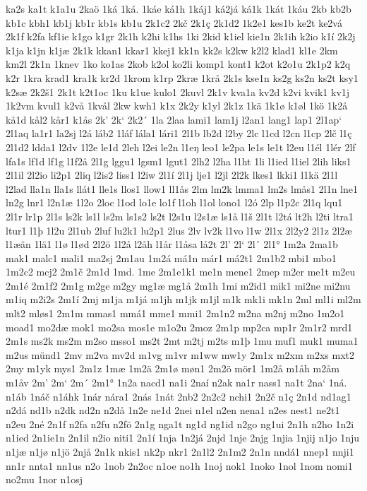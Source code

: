 ka2s
ka1t
k1a1u
2kaö
1ká
1ká.
1káe
ká1h
1káj1
ká2já
ká1k
1kát
1káu
2kb
kb2b
kb1c
kbh1
kb1j
kb1r
kb1s
kb1u
2k1c2
2kč
2k1ç
2k1d2
1k2e1
kes1b
ke2t
ke2vá
2k1f
k2fa
kf1ie
k1go
k1gr
2k1h
k2hi
k1hs
1ki
2kid
k1iel
kie1n
2k1ih
k2io
k1í
2k2j
k1ja
k1jn
k1jæ
2k1k
kkan1
kkar1
kkej1
kk1n
kk2s
k2kw
k2l2
klad1
kl1e
2km
km2l
2k1n
1knev
1ko
ko1as
2kob
k2ol
ko2li
komp1
kont1
k2ot
k2o1u
2k1p2
k2q
k2r
1kra
krad1
kra1k
kr2d
1krom
k1rp
2kræ
1krå
2k1s
kse1n
ks2g
ks2n
ks2t
ksy1
k2sæ
2k2š1
2k1t
k2t1oc
1ku
k1ue
kulo1
2kuvl
2k1v
kva1a
kv2d
k2vi
kvik1
kv1j
1k2vm
kvul1
k2vå
1kvål
2kw
kwh1
k1x
2k2y
k1yl
2k1z
1kä
1k1ø
k1øl
1kö
1k2å
kå1d
kål2
kår1
k1ås
2k'
2k`
2k2´
1la
2laa
lami1
lam1j
l2an1
lang1
lap1
2l1ap`
2l1aq
la1r1
la2sj
l2á
láb2
1láf
lála1
lári1
2l1b
lb2d
l2by
2lc
l1cd
l2cn
l1cp
2lč
l1ç
2l1d2
ldda1
l2dv
1l2e
le1d
2leh
l2ei
le2n
l1eŋ
leo1
le2pa
le1s
le1t
l2eu
l1él
1lér
2lf
lfa1s
lf1d
lf1g
l1f2å
2l1g
lggu1
lgsm1
lgut1
2lh2
l2ha
l1ht
1li
l1ied
l1iel
2lih
liks1
2l1il
2l2io
li2p1
2liq
l2is2
liss1
l2iw
2l1í
2l1j
lje1
l2jl
2l2k
lkes1
lkki1
l1kä
2l1l
l2lad
lla1n
lla1s
llát1
lle1s
llos1
llow1
ll1ås
2lm
lm2k
lmma1
lm2s
lmås1
2l1n
lne1
ln2g
lnr1
l2n1æ
1l2o
2loc
l1od
lo1e
lo1f
l1oh
l1ol
lono1
l2ó
2lp
l1p2c
2l1q
lqu1
2l1r
lr1p
2l1s
ls2k
ls1l
ls2m
ls1s2
ls2t
l2s1u
l2s1æ
ls1å
l1š
2l1t
l2tá
lt2h
l2ti
ltra1
ltur1
l1þ
1l2u
2l1ub
2luf
lu2k1
lu2p1
2lus
2lv
lv2k
l1vo
l1w
2l1x
2l2y2
2l1z
2l2æ
l1æän
1lä1
l1ø
l1ød
2l2ö
1l2å
l2åh
l1år
l1åsa
lå2t
2l'
2l`
2l´
2l1°
1m2a
2ma1b
mak1
malc1
mali1
ma2sj
2m1au
1m2á
má1n
már1
má2t1
2m1b2
mbi1
mbo1
1m2c2
mcj2
2m1č
2m1d
1md.
1me
2m1e1k1
me1n
mene1
2mep
m2er
me1t
m2eu
2m1é
2m1f2
2m1g
m2ge
m2gy
mg1æ
mg1å
2m1h
1mi
m2id1
mik1
mi2ne
mi2nu
m1iq
m2i2s
2m1í
2mj
m1ja
m1já
m1jh
m1jk
m1jl
m1k
mk1i
mk1n
2ml
ml1i
ml2m
mlt2
mløs1
2m1m
mmas1
mmá1
mme1
mmi1
2m1n2
m2na
m2nj
m2no
1m2o1
moad1
mo2dæ
mok1
mo2sa
mos1e
m1o2u
2moz
2m1p
mp2ca
mp1r
2m1r2
mrd1
2m1s
ms2k
ms2m
m2so
msso1
ms2t
2mt
m2tj
m2ts
m1þ
1mu
muf1
muk1
muma1
m2us
münd1
2mv
m2va
mv2d
m1vg
m1vr
m1ww
mw1y
2m1x
m2xm
m2xs
mxt2
2my
m1yk
mys1
2m1z
1mæ
1m2ä
2m1ø
møn1
2m2ö
mör1
1m2å
m1åh
m2åm
m1åv
2m'
2m`
2m´
2m1°
1n2a
nacd1
na1i
2naí
n2ak
na1r
nass1
na1t
2na`
1ná.
n1áb
1náč
n1áhk
1nár
nára1
2nás
1nát
2nb2
2n2c2
nchi1
2n2č
n1ç
2n1d
nd1ag1
n2dá
nd1b
n2dk
nd2n
n2då
1n2e
ne1d
2nei
n1el
n2en
nena1
n2es
nest1
ne2t1
n2eu
2né
2n1f
n2fa
n2fu
n2fö
2n1g
nga1t
ng1d
ng1id
n2go
ng1ui
2n1h
n2ho
1n2i
n1ied
2n1ie1n
2n1il
n2io
niti1
2n1í
1nja
1n2já
2njd
1nje
2njg
1njia
1njij
n1jo
1nju
n1jæ
n1jø
n1jö
2njå
2n1k
nkis1
nk2p
nkr1
2n1l2
2n1m2
2n1n
nndá1
nnep1
nnji1
nn1r
nnta1
nn1us
n2o
1nob
2n2oc
n1oe
no1h
1noj
nok1
1noko
1nol
1nom
nomi1
no2mu
1nor
n1osj
